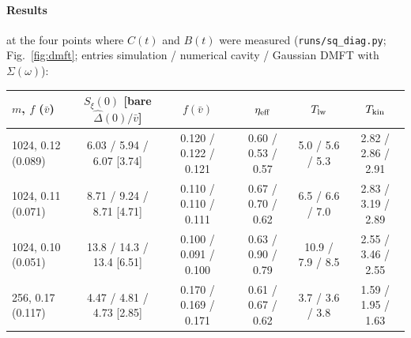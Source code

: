 \documentclass[10pt,a4paper]{article}
\begin{document}
\paragraph{Results} at the four points where $C(t)$ and $B(t)$ were measured (\texttt{runs/sq\_diag.py}; Fig.~\ref{fig:dmft}; entries simulation / numerical cavity / Gaussian DMFT with $\Sigma(\omega)$):

\begin{center}\footnotesize\setlength{\tabcolsep}{4pt}
\begin{tabular}{lccccc}
\toprule
$m$, $f$ ($\bar v$) & $S_\xi(0)$ [bare $\hat\Delta(0)/\bar v$] & $f(\bar v)$ & $\eta_{\rm eff}$ & $T_{\rm lw}$ & $T_{\rm kin}$ \\
\midrule
1024, 0.12 (0.089) & 6.03 / 5.94 / 6.07 [3.74] & 0.120 / 0.122 / 0.121 & 0.60 / 0.53 / 0.57 & 5.0 / 5.6 / 5.3 & 2.82 / 2.86 / 2.91 \\
1024, 0.11 (0.071) & 8.71 / 9.24 / 8.71 [4.71] & 0.110 / 0.110 / 0.111 & 0.67 / 0.70 / 0.62 & 6.5 / 6.6 / 7.0 & 2.83 / 3.19 / 2.89 \\
1024, 0.10 (0.051) & 13.8 / 14.3 / 13.4 [6.51] & 0.100 / 0.091 / 0.100 & 0.63 / 0.90 / 0.79 & 10.9 / 7.9 / 8.5 & 2.55 / 3.46 / 2.55 \\
256, 0.17 (0.117) & 4.47 / 4.81 / 4.73 [2.85] & 0.170 / 0.169 / 0.171 & 0.61 / 0.67 / 0.62 & 3.7 / 3.6 / 3.8 & 1.59 / 1.95 / 1.63 \\
\bottomrule
\end{tabular}
\end{center}
\end{document}
